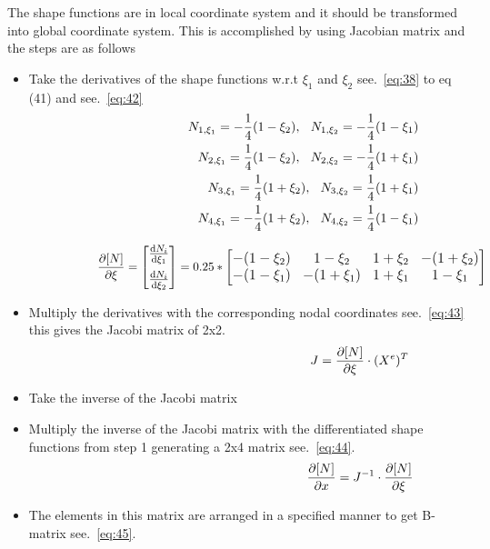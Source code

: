 \documentclass[fleqn, 12.5pt,a4paper]{report}
\newcommand\tab[1][1cm]{\hspace*{#1}}
\begin{document}
The shape functions are in local coordinate system and it should be transformed into global coordinate system. This is accomplished by using Jacobian matrix \cite{khoei2014extended} and the steps are as follows
\begin{itemize}
    \item Take the derivatives of the shape functions w.r.t $\xi_1$ and $\xi_2$ see.~\autoref{eq:38} to eq (41) and see.~\autoref{eq:42}
    \begin{align}\label{eq:38}
    \hspace{3.12cm}N_{1,\xi_1}= -\frac{1}{4}(1-\xi_2), \tab[0.25cm] N_{1,\xi_2}= - \frac{1}{4}(1-\xi_1)\\
    N_{2,\xi_1}=  \frac{1}{4}(1-\xi_2),  \tab[0.25cm] N_{2,\xi_2}= - \frac{1}{4}(1+\xi_1)\\
    N_{3,\xi_1}=  \frac{1}{4}(1+\xi_2),  \tab[0.25cm] N_{3,\xi_2}=  \frac{1}{4}(1+\xi_1)\\
    N_{4,\xi_1}= -\frac{1}{4}(1+\xi_2), \tab[0.25cm] N_{4,\xi_2}=  \frac{1}{4}(1-\xi_1)
    \end{align}
    
    \begin{align}\label{eq:42}
    \hspace{2cm}\pdv{[N]}{\xi} = \large \begin{bmatrix} 
    \dv{N_i} {\xi_1} \\[7pt]
    \dv{N_i} {\xi_2} \\
    \end{bmatrix} \large
    = 0.25*
    \begin{bmatrix}
    -(1-\xi_2) & 1-\xi_2 & 1+\xi_2 & -(1+\xi_2) \\
    -(1-\xi_1) & -(1+\xi_1) & 1+\xi_1 & 1 - \xi_1 \\
    \end{bmatrix}
    \end{align}
    \item Multiply the derivatives with the corresponding nodal coordinates see.~\autoref{eq:43} this gives the Jacobi matrix of 2x2.
    \begin{align}\label{eq:43}
    \hspace{6.25cm} J = \pdv{[N]}{\xi} \cdot (X^e)^T 
    \end{align}
    \item Take the inverse of the Jacobi matrix
    \item Multiply the inverse of the Jacobi matrix with the differentiated shape functions from step 1 generating a 2x4 matrix see.~\autoref{eq:44}.
    \begin{align}\label{eq:44}
    \hspace{6.25cm} \pdv{[N]}{x} = J^{-1} \cdot \pdv{[N]}{\xi} 
    \end{align}
    \item The elements in this matrix are arranged in a specified manner to get B-matrix see.~\autoref{eq:45}.  
    
\end{itemize}
\end{document}
